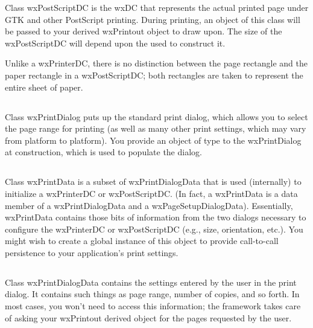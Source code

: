 Class wxPostScriptDC is the wxDC that represents the actual printed page under
GTK and other PostScript printing. During printing, an object of this class will
be passed to your derived wxPrintout object to draw upon. The size of the
wxPostScriptDC will depend upon the  used to
construct it.

Unlike a wxPrinterDC, there is no distinction between the page rectangle and the
paper rectangle in a wxPostScriptDC; both rectangles are taken to represent the
entire sheet of paper.

\subsection{}

Class wxPrintDialog puts up the standard print dialog, which allows you to
select the page range for printing (as well as many other print settings, which
may vary from platform to platform). You provide an object of type
 to the wxPrintDialog at
construction, which is used to populate the dialog.

\subsection{}

Class wxPrintData is a subset of wxPrintDialogData that is used (internally) to
initialize a wxPrinterDC or wxPostScriptDC. (In fact, a wxPrintData is a data
member of a wxPrintDialogData and a wxPageSetupDialogData). Essentially,
wxPrintData contains those bits of information from the two dialogs necessary to
configure the wxPrinterDC or wxPostScriptDC (e.g., size, orientation, etc.). You
might wish to create a global instance of this object to provide call-to-call
persistence to your application's print settings.

\subsection{}

Class wxPrintDialogData contains the settings entered by the user in the print
dialog. It contains such things as page range, number of copies, and so forth.
In most cases, you won't need to access this information; the framework takes
care of asking your wxPrintout derived object for the pages requested by the
user.

